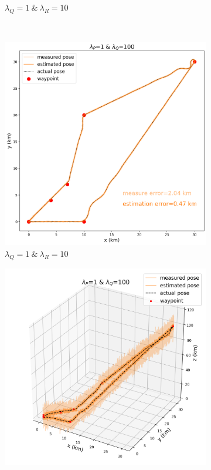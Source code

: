 \begin{figure}[h]
\begin{subfigure}[t]{0.24\textwidth}
 		\caption{$\lambda_Q=1\:\&\:\lambda_R=10$}
 	\end{subfigure} \\
 	\hfill
 	\begin{subfigure}[t]{0.24\textwidth}
 		\centering
 		\includegraphics[width=\linewidth]{figures/estimate_P1_Q100_2d.png}
 		\caption{$\lambda_Q=1\:\&\:\lambda_R=10$}
 	\end{subfigure} 
 	\hfill
 	\begin{subfigure}[t]{0.24\textwidth}
 		\centering
 		\includegraphics[width=\linewidth]{figures/estimate_P1_Q100_3d.png}

\end{subfigure}
\end{figure}
